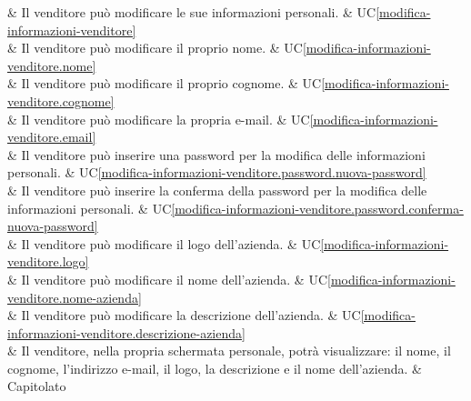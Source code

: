 & Il venditore può modificare le sue informazioni personali. & UC\ref{modifica-informazioni-venditore} \\
	
 & Il venditore può modificare il proprio nome. & UC\ref{modifica-informazioni-venditore.nome} \\
	
 & Il venditore può modificare il proprio cognome. & UC\ref{modifica-informazioni-venditore.cognome} \\
	
 & Il venditore può modificare la propria e-mail. & UC\ref{modifica-informazioni-venditore.email} \\
	
 & Il venditore può inserire una password per la modifica delle informazioni personali. & UC\ref{modifica-informazioni-venditore.password.nuova-password} \\
	
 & Il venditore può inserire la conferma  della password per la modifica delle informazioni personali. & UC\ref{modifica-informazioni-venditore.password.conferma-nuova-password} \\
	
 & Il venditore può modificare il logo dell'azienda. & UC\ref{modifica-informazioni-venditore.logo} \\
	
 & Il venditore può modificare il nome dell'azienda. & UC\ref{modifica-informazioni-venditore.nome-azienda} \\
	
 & Il venditore può modificare la descrizione dell'azienda. & UC\ref{modifica-informazioni-venditore.descrizione-azienda} \\
	
 & Il venditore, nella propria schermata personale, potrà visualizzare: il nome, il cognome, l'indirizzo e-mail, il logo, la descrizione e il nome dell'azienda. & Capitolato \\ 
